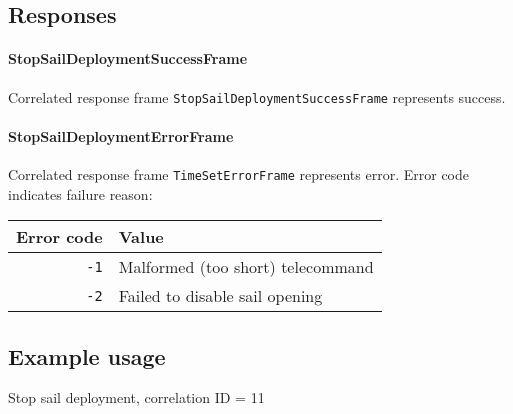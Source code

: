 \subsection{Responses}

\paragraph{StopSailDeploymentSuccessFrame}
Correlated response frame \texttt{StopSailDeploymentSuccessFrame} represents success.

\paragraph{StopSailDeploymentErrorFrame}
Correlated response frame \texttt{TimeSetErrorFrame} represents error. Error code indicates failure reason:

\begin{tabular}{r | l}
	Error code & Value \\
	\hline
	\texttt{-1} & Malformed (too short) telecommand \\	
	\texttt{-2} & Failed to disable sail opening \\	
\end{tabular}

\subsection{Example usage}
Stop sail deployment, correlation ID = 11

